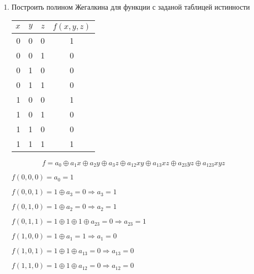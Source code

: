 \documentclass{article}
\begin{document}
\begin{enumerate}
\item Построить полином Жегалкина для функции с заданой таблицей истинности


\begin{tabular}{|r|r|r|c|}
\hline
$x$ & $y$ & $z$ & $f(x, y, z)$ \\
\hline
0 & 0 & 0 & 1 \\
\hline
0 & 0 & 1 & 0 \\
\hline
0 & 1 & 0 & 0 \\
\hline
0 & 1 & 1 & 0 \\
\hline
1 & 0 & 0 & 1 \\
\hline
1 & 0 & 1 & 0 \\
\hline
1 & 1 & 0 & 0 \\
\hline
1 & 1 & 1 & 1 \\
\hline
\end{tabular}
\begin{comment}
#+ORGTBL: SEND table3 orgtbl-to-latex :splice t :skip 0
|-----+-----+-----+--------------|
| $x$ | $y$ | $z$ | $f(x, y, z)$ |
|-----+-----+-----+--------------|
|   0 |   0 |   0 |            1 |
|-----+-----+-----+--------------|
|   0 |   0 |   1 |            0 |
|-----+-----+-----+--------------|
|   0 |   1 |   0 |            0 |
|-----+-----+-----+--------------|
|   0 |   1 |   1 |            0 |
|-----+-----+-----+--------------|
|   1 |   0 |   0 |            1 |
|-----+-----+-----+--------------|
|   1 |   0 |   1 |            0 |
|-----+-----+-----+--------------|
|   1 |   1 |   0 |            0 |
|-----+-----+-----+--------------|
|   1 |   1 |   1 |            1 |
|-----+-----+-----+--------------|
\end{comment}

$$f = a_{0} \oplus a_{1}x \oplus a_{2}y \oplus a_{3}z \oplus
a_{12}xy \oplus a_{13}xz \oplus a_{23}yz \oplus a_{123}xyz $$

$f(0, 0, 0) = a_{0} = 1$

$f(0, 0, 1) = 1 \oplus a_{3} = 0 \Rightarrow a_{3} = 1$

$f(0, 1, 0) = 1 \oplus a_{2} = 0 \Rightarrow a_{2} = 1$

$f(0, 1, 1) = 1 \oplus 1 \oplus 1 \oplus a_{23} = 0 \Rightarrow a_{23}
= 1$

$f(1, 0, 0) = 1 \oplus a_{1} = 1 \Rightarrow a_{1} = 0$

$f(1, 0, 1) = 1 \oplus 1 \oplus a_{13} = 0 \Rightarrow a_{13} = 0$

$f(1, 1, 0) = 1 \oplus 1 \oplus a_{12} = 0 \Rightarrow a_{12} = 0$


\end{enumerate}
\end{document}
